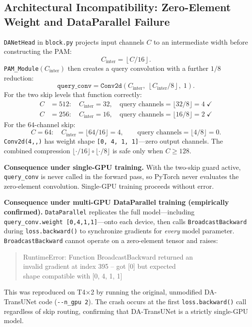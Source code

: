 \documentclass[conference]{IEEEtran}
\begin{document}
\subsection{Architectural Incompatibility: Zero-Element Weight and DataParallel Failure}

\texttt{DANetHead} in \texttt{block.py} projects input channels $C$ to an intermediate width before constructing the PAM:
\[
  C_{\text{inter}} = \left\lfloor C / 16 \right\rfloor.
\]
\texttt{PAM\_Module}$(C_{\text{inter}})$ then creates a query convolution with a further $1/8$ reduction:
\[
  \texttt{query\_conv} = \texttt{Conv2d}\!\left(C_{\text{inter}},\;\left\lfloor C_{\text{inter}} / 8 \right\rfloor,\;1\right).
\]
For the two skip levels that function correctly:
\begin{align*}
  C &= 512:\quad C_{\text{inter}} = 32,\quad \text{query channels} = \lfloor 32/8 \rfloor = 4 \;\checkmark \\
  C &= 256:\quad C_{\text{inter}} = 16,\quad \text{query channels} = \lfloor 16/8 \rfloor = 2 \;\checkmark
\end{align*}
For the 64-channel skip:
\[
  C = 64:\quad C_{\text{inter}} = \lfloor 64/16 \rfloor = 4, \qquad \text{query channels} = \lfloor 4/8 \rfloor = 0.
\]
\texttt{Conv2d(4,,)} has weight shape \texttt{[0,\,4,\,1,\,1]}---zero output channels. The combined compression $\lfloor \cdot/16 \rfloor \circ \lfloor \cdot/8 \rfloor$ is safe only when $C \geq 128$.

\textbf{Consequence under single-GPU training.} With the two-skip guard active, \texttt{query\_conv} is never called in the forward pass, so PyTorch never evaluates the zero-element convolution. Single-GPU training proceeds without error.

\textbf{Consequence under multi-GPU DataParallel training (empirically confirmed).} \texttt{DataParallel} replicates the full model---including \texttt{query\_conv.weight}~\texttt{[0,4,1,1]}---onto each device, then calls \texttt{BroadcastBackward} during \texttt{loss.backward()} to synchronize gradients for \emph{every} model parameter. \texttt{BroadcastBackward} cannot operate on a zero-element tensor and raises:
\begin{quote}
{\small\ttfamily
RuntimeError: Function BroadcastBackward returned an\\
invalid gradient at index 395 -- got [0] but expected\\
shape compatible with [0, 4, 1, 1]}
\end{quote}
This was reproduced on T4$\times$2 by running the original, unmodified DA-TransUNet code (\texttt{{-}{-}n\_gpu~2}). The crash occurs at the first \texttt{loss.backward()} call regardless of skip routing, confirming that DA-TransUNet is a strictly single-GPU model.
\end{document}
